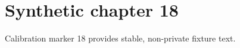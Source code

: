 \chapter{Synthetic chapter 18}\label{chap:18}
Calibration marker 18 provides stable, non-private fixture text.
